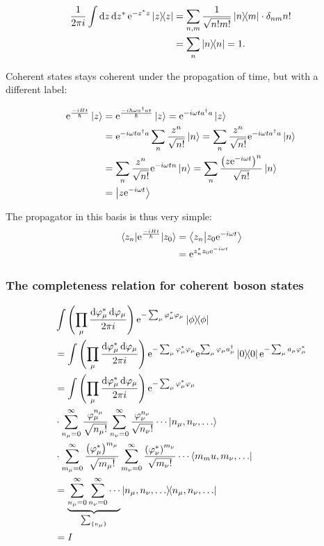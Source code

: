 \begin{align*}
\frac{1}{2\pi i}\int\dd z \dd{z^*}\e^{-z^*z}\dyad z &= \sum_{n, m}\frac{1}{\sqrt{n!m!}}\dyad{n}{m}\cdot \delta_{nm}n! \\
&= \sum_{n}\dyad{n} = 1.
\end{align*}

Coherent states stays coherent under the propagation of time, but with a different label:

\begin{align*}
\mathrm{e}^{\frac{-iHt}{\hbar}}\ket z &= \mathrm{e}^{\frac{-i\hbar\omega a^\dagger at}{\hbar}}\ket z = \mathrm{e}^{-i\omega ta^\dagger a}\ket z \\
&= \mathrm{e}^{-i\omega ta^\dagger a}\sum_n\frac{z^n}{\sqrt{n!}}\ket n = \sum_n\frac{z^n}{\sqrt{n!}}\mathrm{e}^{-i\omega ta^\dagger a}\ket n \\
&=  \sum_n\frac{z^n}{\sqrt{n!}}\mathrm{e}^{-i\omega tn}\ket n = \sum_n\frac{\left(z\mathrm{e}^{-i\omega t}\right)^n}{\sqrt{n!}}\ket n \\
&= \ket{z\mathrm{e}^{-i\omega t}}
\end{align*}

The propagator in this basis is thus very simple:
\begin{align}
\mel{z_n}{\mathrm{e}^{\frac{-iHt}{\hbar}}}{z_0} &= \braket{z_n}{z_0\mathrm{e}^{-i\omega t}} \\
&= \mathrm{e}^{z_n^*z_0\mathrm{e}^{-i\omega t}}
\end{align}

\subsubsection{The completeness relation for coherent boson states}

\begin{align*}
&\int\left(\prod_\mu\frac{\dd{\varphi_\mu^*}\dd{\varphi_\mu}}{2\pi i}\right)\e^{-\sum_\mu\varphi_\mu^*\varphi_\mu}\dyad{\phi}  \\
&= \int\left(\prod_\mu\frac{\dd{\varphi_\mu^*}\dd{\varphi_\mu}}{2\pi i}\right)\e^{-\sum_\mu\varphi_\mu^*\varphi_\mu}\e^{\sum_\mu\varphi_\mu a_\mu^\dagger}\dyad 0 \e^{-\sum_\mu a_\mu\varphi_\mu^*} \\
&=\int\left(\prod_\mu\frac{\dd{\varphi_\mu^*}\dd{\varphi_\mu}}{2\pi i}\right)\e^{-\sum_\mu\varphi_\mu^*\varphi_\mu} \\
&\cdot \sum_{n_{\mu}=0}^\infty\frac{\varphi_\mu^{n_\mu}}{\sqrt{n_\mu!}}\sum_{n_{\nu}=0}^\infty\frac{\varphi_\nu^{n_\nu}}{\sqrt{n_\nu!}}\cdots\ket{n_\mu, n_\nu, \dots}\\
&\cdot \sum_{m_{\mu}=0}^\infty\frac{\left(\varphi_\mu^*\right)^{m_\mu}}{\sqrt{m_\mu!}}\sum_{m_{\nu}=0}^\infty\frac{\left(\varphi_\nu^*\right)^{m_\nu}}{\sqrt{m_\nu!}}\cdots \bra{m_mu, m_\nu, \dots} \\
&= \underbrace{\sum_{n_\mu = 0}^\infty\sum_{n_\nu = 0}^\infty\cdots}_{\sum_{\{n_\mu\}}} \dyad{n_\mu, n_\nu, \dots} \\
&= I
\end{align*}


